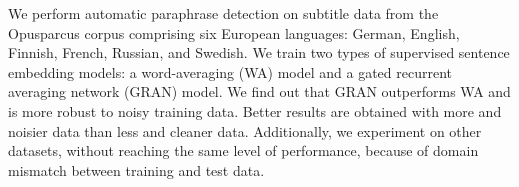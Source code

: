 We perform automatic paraphrase detection on subtitle data from the Opusparcus corpus comprising six European languages: German, English, Finnish, French, Russian, and Swedish. We train two types of supervised sentence embedding models: a word-averaging (WA) model and a gated recurrent averaging network (GRAN) model. We find out that GRAN outperforms WA and is more robust to noisy training data. Better results are obtained with more and noisier data than less and cleaner data. Additionally, we experiment on other datasets, without reaching the same level of performance, because of domain mismatch between training and test data.
